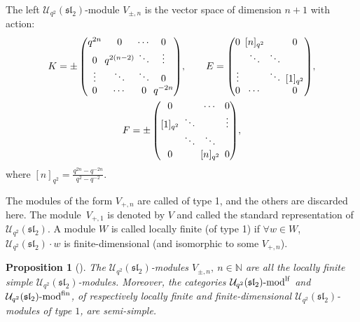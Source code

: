 \documentclass[pdftex]{sigma}%
\numberwithin{equation}{section}
\newtheorem{Proposition}[Theorem]{Proposition}
 { \theoremstyle{definition}
\newtheorem{Definition}[Theorem]{Definition}
\newtheorem{Note}[Theorem]{Note}
\newtheorem{Example}[Theorem]{Example}
\newtheorem{Remark}[Theorem]{Remark} }
\newcommand{\Uq}{\mathcal{U}_{q^2}(\mathfrak{sl}_2)}
\begin{document}
\begin{Definition}
The left $\Uq$-module $V_{\pm,n}$ is the vector space of dimension $n+1$ with action:
\begin{gather*}
 K=\pm \setlength{\arraycolsep}{1.5pt}\begin{pmatrix}
 q^{2n} & 0& \cdots & 0 \\ 0& q^{2(n-2)} &\ddots &\vdots \\ \vdots &\ddots &\ddots&0 \\ 0 &\cdots&0& q^{-2n}\end{pmatrix}\!,\qquad
 E=\setlength{\arraycolsep}{2.5pt}\begin{pmatrix}
 0 & [n]_{q^2}& & 0 \\ & \ddots &\ddots & \\ \vdots & &\ddots&[1]_{q^2} \\ 0 & \cdots & & 0\end{pmatrix}\!,\\
 F=\setlength{\arraycolsep}{2.5pt}\pm \begin{pmatrix}
 0 & & \cdots & 0 \\ {[1]_{q^2}} & \ddots & & \vdots\\ & \ddots&\ddots& \\ 0 & & [n]_{q^2}& 0\end{pmatrix}\!,
 \end{gather*}
 where $ [n]_{q^2} = \frac{q^{2n}-q^{-2n}}{q^2-q^{-2}}$.

The modules of the form $V_{+,n}$ are called of type 1, and the others are discarded here. The mo\-du\-le~$V_{+,1}$ is denoted by $V$ and called the standard representation of $\Uq$.
A module $W$ is called locally finite (of type 1) if $\forall w \in W$, $\Uq \cdot w$ is finite-dimensional (and isomorphic to some $V_{+,n}$).
\end{Definition}

\begin{Proposition}[{\cite[Theorem~VII.2.2]{Kassel}}]
The $\Uq$-modules $V_{\pm,n},\ n \in \mathbb{N}$ are all the locally finite simple $\Uq$-modules. Moreover, the categories $\Uq\text{-}{\rm mod}^{\rm lf}$ and $\Uq\text{-}{\rm mod}^{\rm fin}$, of respectively locally finite and finite-dimensional $\Uq$-modules of type $1$, are semi-simple.
\end{Proposition}
\end{document}
